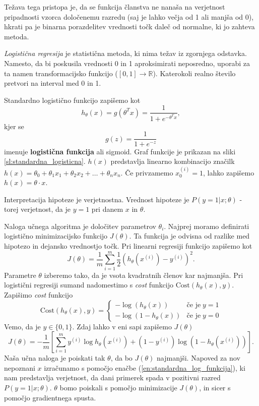 \documentclass[11pt,a4paper,openany]{book}
\begin{document}
Težava tega pristopa je, da se funkcija članstva ne nanaša na verjetnost pripadnosti vzorca določenemu razredu (saj je lahko večja od 1 ali manjša od 0), hkrati pa je binarna porazdelitev vrednosti točk daleč od normalne, ki jo zahteva metoda.

\textit{Logistična regresija} je statistična metoda, ki nima težav iz zgornjega odstavka. Namesto, da bi poskusila vrednosti 0 in 1 aproksimirati neposredno, uporabi za ta namen transformacijsko funkcijo ($[0, 1] \rightarrow \mathbb{R}$). Katerokoli realno število pretvori na interval med 0 in 1.

Standardno logistično funkcijo zapišemo kot
\begin{equation}
	\label{en:standardna_log_funkcija}
	h_\theta(x) = g(\theta^Tx) = \frac{1}{1 + e^{-\theta^Tx}},
\end{equation}
kjer se
\begin{equation}
	g(z) = \frac{1}{1 + e^{-z}}
\end{equation}
imenuje \textbf{logistična funkcija} ali {sigmoid}. Graf funkcije je prikazan na sliki \ref{sl:standardna_logisticna}.
$h(x)$ predstavlja linearno kombinacijo značilk $h(x) = \theta_0 + \theta_1x_1 + \theta_2x_2 + \dots + \theta_nx_n$. Če privzamemo $x_0^{(i)} = 1$, lahko zapišemo $h(x) = \theta \cdot x$.

Interpretacija hipoteze je verjetnostna. Vrednost hipoteze je $P(y=1|x;\theta)$ - torej verjetnost, da je $y = 1$ pri danem $x$ in $\theta$.

Naloga učnega algoritma je določitev parametrov $\theta_i$. Najprej moramo definirati logistično minimizacijsko funkcijo $J(\theta)$. Ta funkcija je odvisna od razlike med hipotezo in dejansko vrednostjo točk. Pri linearni regresiji funkcijo zapišemo kot
\begin{equation}
	J(\theta) = \frac{1}{m} \sum^m_{i = 1} \frac{1}{2} \left( h_\theta(x^{(i)}) - y^{(i)}\right)^2.
\end{equation}
Parametre $\theta$ izberemo tako, da je vsota kvadratnih členov kar najmanjša. Pri logistični regresiji sumand nadomestimo s \textit{cost} funkcijo $\text{Cost}(h_\theta(x), y)$. Zapišimo \textit{cost} funkcijo
\begin{equation}
	\text{Cost}(h_\theta(x), y) = \left\{
	\begin{array}{rl}
		-\log(h_\theta(x)) & \text{če je} \; y = 1 \\
		-\log(1 - h_\theta(x)) & \text{če je} \; y = 0
	\end{array}
	\right.
\end{equation}
Vemo, da je $y \in \{0, 1\}$. Zdaj lahko v eni sapi zapišemo $J(\theta)$
\begin{equation}
	J(\theta) = -\frac{1}{m} \left[ 
		\sum^m_{i = 1}
			y^{(i)} \log h_\theta(x^{(i)}) + (1 - y^{(i)}) \log (1 - h_\theta(x^{(i)}))
	\right].
	\label{en:j_theta}
\end{equation}
Naša učna naloga je poiskati tak $\theta$, da bo $J(\theta)$ najmanjši. Napoved za nov nepoznani $x$ izračunamo s pomočjo enačbe (\ref{en:standardna_log_funkcija}), ki nam predstavlja verjetnost, da dani primerek spada v pozitivni razred $P(y = 1 | x;\theta)$. $\theta$ bomo poiskali s pomočjo minimizacije $J(\theta)$, in sicer s pomočjo gradientnega spusta.
\end{document}
